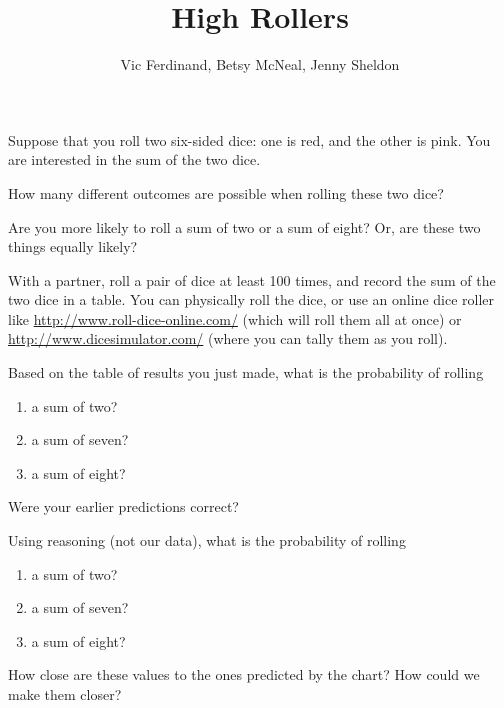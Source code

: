 \documentclass[nooutcomes]{ximera}
\title{High Rollers}
\author{Vic Ferdinand, Betsy McNeal, Jenny Sheldon}
\begin{document}
\begin{abstract}
\end{abstract}
\maketitle



Suppose that you roll two six-sided dice: one is red, and the other is pink.  You are interested in the sum of the two dice.

\begin{problem}
How many different outcomes are possible when rolling these two dice?
\end{problem}

\begin{problem} 
Are you more likely to roll a sum of two or a sum of eight?  Or, are these two things equally likely?
\end{problem}

With a partner, roll a pair of dice at least 100 times, and record the sum of the two dice in a table.  You can physically roll the dice, or use an online dice roller like \url{http://www.roll-dice-online.com/} (which will roll them all at once) or \url{http://www.dicesimulator.com/} (where you can tally them as you roll).


\begin{problem}
Based on the table of results you just made, what is the probability of rolling
\begin{enumerate}
\item a sum of two?
\item a sum of seven?
\item a sum of eight?
\end{enumerate}
Were your earlier predictions correct?
\end{problem}

\begin{problem}
Using reasoning (not our data), what is the probability of rolling
\begin{enumerate}
\item a sum of two?
\item a sum of seven?
\item a sum of eight?
\end{enumerate}
How close are these values to the ones predicted by the chart?  How could we make them closer?
\end{problem}
\end{document}
